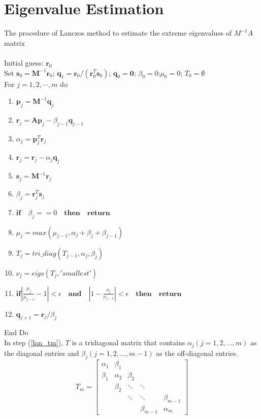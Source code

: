 \section{Eigenvalue Estimation}                               %
The procedure of Lanczos method to estimate the extreme eigenvalues of $M^{-1}A$ matrix\\
\space \\
Initial guess: $\textbf{r}_0$\\
Set $\textbf{s}_0=\textbf{M}^{-1}\textbf{r}_0$;  $\textbf{q}_1 = \textbf{r}_0/({\textbf{r}_0^T\textbf{s}_0})$; $\textbf{q}_0=\textbf{0}$;  $\beta_0 =0$;\quad  $\mu_0 =0$; $T_0=\emptyset$   \\
For $j = 1, 2, \cdots,  m$  do
\begin{enumerate}
\item $\textbf{p}_j = \textbf{M}^{-1}\textbf{q}_j  $
\item $ \textbf{r}_j =\textbf{A}\textbf{p}_j-\beta_{j-1}\textbf{q}_{j-1} $
\item $\alpha_j =\textbf{p}_j^T\textbf{r}_j $
\item $\textbf{r}_j =\textbf{r}_j-\alpha_{j}\textbf{q}_{j} $
\item $\textbf{s}_j = \textbf{M}^{-1}\textbf{r}_j $
\item $\beta_j = \textbf{r}_j^T\textbf{s}_j $
\item $\textbf{if} \quad\beta_j == 0\quad \textbf{then}\quad \textbf{return}  $
\item $\mu_j = max(\mu_{j-1},\alpha_j+\beta_j+\beta_{j-1})  $\label{lan_gersh}
\item $T_j=tri\_diag(T_{j-1},\alpha_j,\beta_j) $\label{lan_tm}
\item $\nu_j = eigs(T_j, 'smallest')  $ \label{lan_nu}
\item $\textbf{if} |\frac{\mu_j}{\mu_{j-1}} -1 | < \epsilon\quad\textbf{and}\quad|1- \frac{\nu_j}{\nu_{j-1}}|< \epsilon \quad\textbf{then} \quad\textbf{return}    $\label{lanczos_converge}
\item $\textbf{q}_{j+1}= \textbf{r}_j/\beta_j $
\end{enumerate}
End Do \\


In step (\ref{lan_tm}), $T$ is a tridiagonal matrix that contains $\alpha_j(j=1,2,...,m)$ as the diagonal entries and $\beta_j (j=1,2,...,m-1)$ as the off-diagonal entries.
\[ T_{m} =  \left[\begin{array}{ccccc}
\alpha_1 & \beta_1 &   &  &   \\
\beta_1 &\alpha_2 &\beta_2    &   &     \\
& \beta_2 &\ddots &\ddots &\\
& & \ddots& \ddots& \beta_{m-1}\\
& &&  \beta_{m-1}& \alpha_m
\end{array} \right]\]

